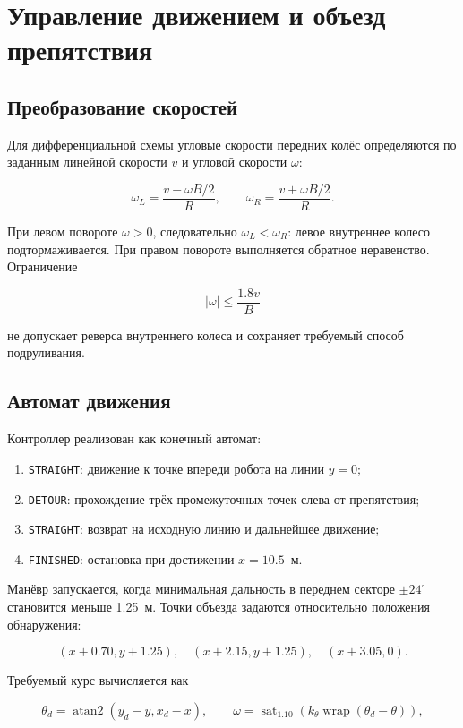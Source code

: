 \documentclass[a4paper,12pt]{article}
\begin{document}
\section{Управление движением и объезд препятствия}

\subsection{Преобразование скоростей}

Для дифференциальной схемы угловые скорости передних колёс определяются по
заданным линейной скорости $v$ и угловой скорости $\omega$:

\[
\omega_L=\frac{v-\omega B/2}{R},
\qquad
\omega_R=\frac{v+\omega B/2}{R}.
\]

При левом повороте $\omega>0$, следовательно $\omega_L<\omega_R$: левое
внутреннее колесо подтормаживается. При правом повороте выполняется обратное
неравенство. Ограничение

\[
|\omega|\leq\frac{1.8v}{B}
\]

не допускает реверса внутреннего колеса и сохраняет требуемый способ
подруливания.

\subsection{Автомат движения}

Контроллер реализован как конечный автомат:

\begin{enumerate}
    \item \texttt{STRAIGHT}: движение к точке впереди робота на линии $y=0$;
    \item \texttt{DETOUR}: прохождение трёх промежуточных точек слева от
    препятствия;
    \item \texttt{STRAIGHT}: возврат на исходную линию и дальнейшее движение;
    \item \texttt{FINISHED}: остановка при достижении $x=10.5$~м.
\end{enumerate}

Манёвр запускается, когда минимальная дальность в переднем секторе
$\pm24^\circ$ становится меньше 1.25~м. Точки объезда задаются относительно
положения обнаружения:

\[
(x+0.70,y+1.25),\quad (x+2.15,y+1.25),\quad (x+3.05,0).
\]

Требуемый курс вычисляется как

\[
\theta_d=\operatorname{atan2}(y_d-y,x_d-x),
\qquad
\omega=\operatorname{sat}_{1.10}\!\left(k_\theta
\operatorname{wrap}(\theta_d-\theta)\right),
\]
\end{document}
